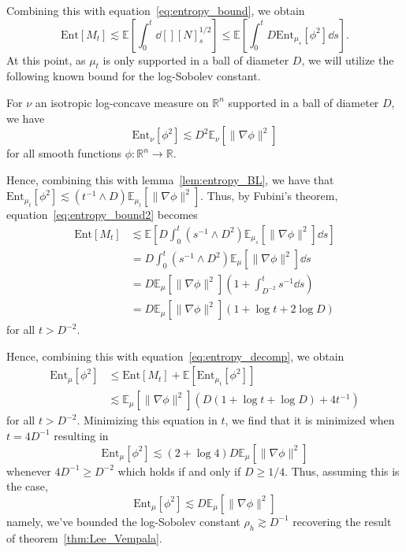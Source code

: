 Combining this with equation~\eqref{eq:entropy_bound}, we obtain 
\begin{equation}\label{eq:entropy_bound2}
  \text{Ent}[M_t] \lesssim \mathbb{E}\left[\int_0^t \dd[] [N]_s^{1 / 2}\right]
    \le \mathbb{E}\left[\int_0^t D \text{Ent}_{\mu_s}[\phi^2] \dd s\right].
\end{equation}
At this point, as \(\mu_t\) is only supported in a ball of diameter \(D\), 
we will utilize the following known bound for the log-Sobolev constant.
\begin{lemma}\label{lem:entropy_supp}
  For \(\nu\) an isotropic log-concave measure on \(\mathbb{R}^n\) supported in a ball of diameter \(D\), 
  we have
  \[\text{Ent}_\nu[\phi^2] \lesssim D^2 \mathbb{E}_\nu[\|\nabla \phi\|^2]\]
  for all smooth functions \(\phi : \mathbb{R}^n \to \mathbb{R}\).
\end{lemma}
Hence, combining this with lemma~\ref{lem:entropy_BL}, we have that 
\(\text{Ent}_{\mu_t}[\phi^2] \lesssim (t^{-1} \wedge D) \mathbb{E}_{\mu_t}[\|\nabla \phi\|^2]\). Thus, 
by Fubini's theorem, equation~\eqref{eq:entropy_bound2} becomes
\begin{align*}
  \text{Ent}[M_t] & \lesssim \mathbb{E}\left[D \int_0^t (s^{-1} \wedge D^2)\mathbb{E}_{\mu_s}[\|\nabla \phi\|^2] \dd s\right]\\
    & = D \int_0^t (s^{-1} \wedge D^2)\mathbb{E}_\mu[\|\nabla \phi\|^2] \dd s\\
    & = D \mathbb{E}_\mu[\|\nabla \phi\|^2] \left(1 + \int_{D^{-2}}^t s^{-1}\dd s\right)\\
    & = D \mathbb{E}_\mu[\|\nabla \phi\|^2] (1 + \log t + 2\log D)
\end{align*}
for all \(t > D^{-2}\).

Hence, combining this with equation~\eqref{eq:entropy_decomp}, we obtain
\begin{align*}
  \text{Ent}_\mu[\phi^2] & \le \text{Ent}[M_t] + \mathbb{E}[\text{Ent}_{\mu_t}[\phi^2]]\\
  & \lesssim \mathbb{E}_\mu[\|\nabla \phi\|^2](D (1 + \log t + \log D) + 4t^{-1})
\end{align*}
for all \(t > D^{-2}\). Minimizing this equation in \(t\), we find that it is minimized when \(t = 4D^{-1}\) resulting in 
\[\text{Ent}_\mu[\phi^2] \lesssim (2 + \log 4)D\mathbb{E}_\mu[\|\nabla \phi\|^2]\]
whenever \(4D^{-1} \ge D^{-2}\) which holds if and only if \(D \ge 1 / 4\). Thus, assuming this is the case,  
\[\text{Ent}_\mu[\phi^2] \lesssim D \mathbb{E}_\mu[\|\nabla \phi\|^2]\]
namely, we've bounded the log-Sobolev constant \(\rho_h \gtrsim D^{-1}\) recovering the result of theorem~\ref{thm:Lee_Vempala}.

